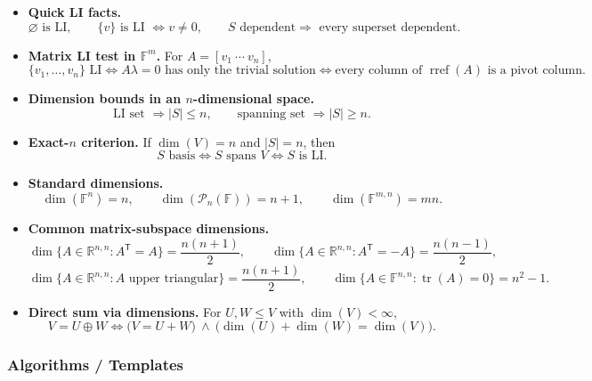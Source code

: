 \begin{itemize}[leftmargin=*]
\item \textbf{Quick LI facts.}
\[
\varnothing\text{ is LI},
\qquad
\{v\}\text{ is LI }\iff v\neq 0,
\qquad
S\text{ dependent}\Rightarrow\text{ every superset dependent}.
\]

\item \textbf{Matrix LI test in $\mathbb F^m$.} For $A=[v_1\ \cdots\ v_n]$,
\[
\{v_1,\dots,v_n\}\text{ LI}
\iff A\lambda=0\text{ has only the trivial solution}
\iff\text{every column of }\operatorname{rref}(A)\text{ is a pivot column}.
\]

\item \textbf{Dimension bounds in an $n$-dimensional space.}
\[
\text{LI set }\Rightarrow |S|\le n,
\qquad
\text{spanning set }\Rightarrow |S|\ge n.
\]

\item \textbf{Exact-$n$ criterion.} If $\dim(V)=n$ and $|S|=n$, then
\[
S\text{ basis}
\iff S\text{ spans }V
\iff S\text{ is LI}.
\]

\item \textbf{Standard dimensions.}
\[
\dim(\mathbb F^n)=n,
\qquad
\dim(\mathcal P_n(\mathbb F))=n+1,
\qquad
\dim(\mathbb F^{m,n})=mn.
\]

\item \textbf{Common matrix-subspace dimensions.}
\[
\dim\{A\in\mathbb R^{n,n}:A^\mathsf T=A\}=\frac{n(n+1)}{2},
\qquad
\dim\{A\in\mathbb R^{n,n}:A^\mathsf T=-A\}=\frac{n(n-1)}{2},
\]
\[
\dim\{A\in\mathbb R^{n,n}:A\text{ upper triangular}\}=\frac{n(n+1)}{2},
\qquad
\dim\{A\in\mathbb F^{n,n}:\operatorname{tr}(A)=0\}=n^2-1.
\]

\item \textbf{Direct sum via dimensions.} For $U,W\le V$ with $\dim(V)<\infty$,
\[
V=U\oplus W
\iff
\bigl(V=U+W\bigr)\ \wedge\ \bigl(\dim(U)+\dim(W)=\dim(V)\bigr).
\]
\end{itemize}

\subsubsection*{Algorithms / Templates}


